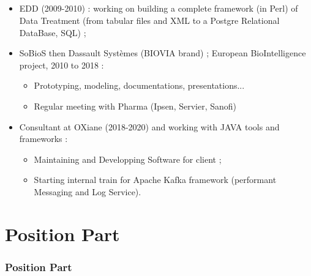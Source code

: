 \documentclass{beamer}
\begin{document}
\subsection{ \titleSubSectionCurriculumPartThree }
\begin{frame}
	\frametitle{ \titleSubSectionCurriculumPartThree }
	\begin{itemize}
		\item EDD (2009-2010) : working on building a complete framework (in Perl) of Data Treatment (from tabular files and XML to a Postgre Relational DataBase, SQL) ;
		\item SoBioS then Dassault Syst{\`e}mes (BIOVIA brand) ; European BioIntelligence project, 2010 to 2018 :
		\begin{itemize}
			\item Prototyping, modeling, documentations, presentations...
			\item Regular meeting with Pharma (Ipsen, Servier, Sanofi)
		\end{itemize}
		\item Consultant at OXiane (2018-2020) and working with JAVA tools and frameworks : 
		\begin{itemize}
			\item Maintaining and Developping Software for client ; 
			\item Starting internal train for Apache Kafka framework (performant Messaging and Log Service). 
		\end{itemize} 
	\end{itemize}
\end{frame} 


\def\titleSectionPositionPart{Position Part}
\section{\titleSectionPositionPart }
\begin{frame}
	\frametitle{\titleSectionPositionPart }
	\tableofcontents[sections=2,currentsection,subsectionstyle=show/shaded/hide]
\end{frame} 

\def\titleSubSectionPositionPartOne{What I come with : Experiences in previous positions !}
\end{document}
